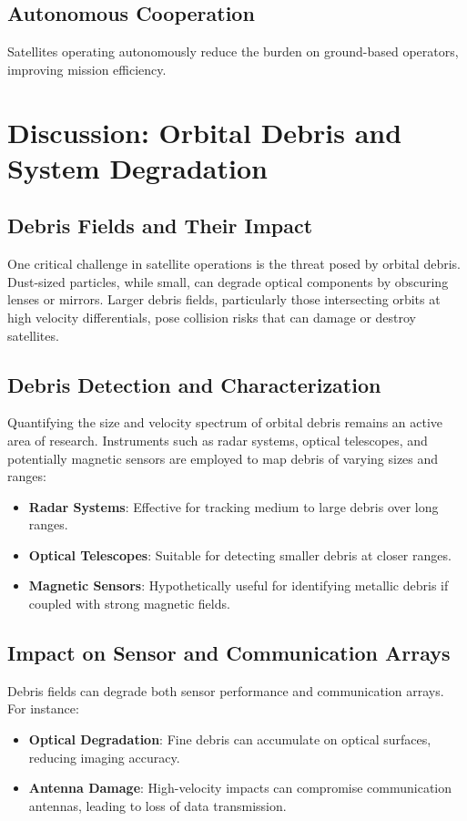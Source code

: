 \documentclass[11pt]{article}
\begin{document}
\subsection{Autonomous Cooperation}
Satellites operating autonomously reduce the burden on ground-based operators, improving mission efficiency.

\section{Discussion: Orbital Debris and System Degradation}
\subsection{Debris Fields and Their Impact}
One critical challenge in satellite operations is the threat posed by orbital debris. Dust-sized particles, while small, can degrade optical components by obscuring lenses or mirrors. Larger debris fields, particularly those intersecting orbits at high velocity differentials, pose collision risks that can damage or destroy satellites.

\subsection{Debris Detection and Characterization}
Quantifying the size and velocity spectrum of orbital debris remains an active area of research. Instruments such as radar systems, optical telescopes, and potentially magnetic sensors are employed to map debris of varying sizes and ranges:
\begin{itemize}
    \item \textbf{Radar Systems}: Effective for tracking medium to large debris over long ranges.
    \item \textbf{Optical Telescopes}: Suitable for detecting smaller debris at closer ranges.
    \item \textbf{Magnetic Sensors}: Hypothetically useful for identifying metallic debris if coupled with strong magnetic fields.
\end{itemize}

\subsection{Impact on Sensor and Communication Arrays}
Debris fields can degrade both sensor performance and communication arrays. For instance:
\begin{itemize}
    \item \textbf{Optical Degradation}: Fine debris can accumulate on optical surfaces, reducing imaging accuracy.
    \item \textbf{Antenna Damage}: High-velocity impacts can compromise communication antennas, leading to loss of data transmission.
\end{itemize}
\end{document}
